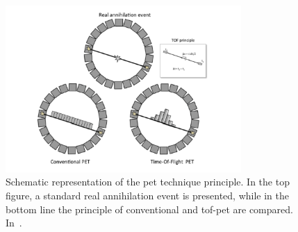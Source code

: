 \begin{table}[!htbp]
\centering
\caption{Proton-nuclear reaction channels and relative positron emitters produced in human tissues. Table reproduced from~\cite{Espana2011b}.}
\label{chap2::tab::petIsotopes}
\end{table}    

\begin{figure}[!htbp]
\centering
\includegraphics[width=0.8\textwidth]{03_GraphicFiles/chapter1_Introduction/PET_concept.pdf}
\caption{Schematic representation of the \gls{pet} technique principle. In the top figure, a standard real annihilation event is presented, while in the bottom line the principle of conventional and \gls{tof}-\gls{pet} are compared. In~\cite{Vandenberghe2016}.}
\label{chap2::fig::PETconcept}
\end{figure}   

